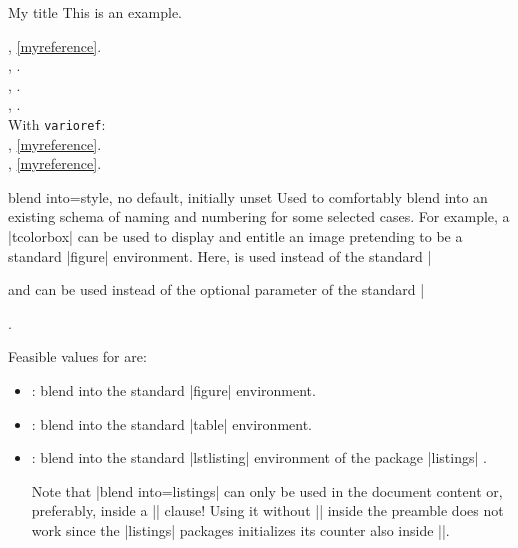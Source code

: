 \begin{dispExample}
\begin{mybluebox}[label={myreference}]{My title}
This is an example.
\end{mybluebox}

, \cref{myreference}.\\
, .\\
, .\\
, .\\
With \texttt{varioref}:\\
, \vref{myreference}.\\
, \vref*{myreference}.
\end{dispExample}

\clearpage

\begin{newTcbKey}[][doc new=2014-09-19]{blend into}{=}{style, no default, initially unset}
Used to comfortably blend into an existing schema of naming and numbering for
some selected cases. For example, a |tcolorbox| can be used to display
and entitle an image pretending to be a standard |figure| environment.
Here,  is used instead of the standard |\caption|
and  can be used instead of the optional parameter
of the standard |\caption|.

Feasible values for  are:
\begin{itemize}
\item{}: blend into the standard |figure| environment.
\item{}: blend into the standard |table| environment.
\item{}: blend into the standard |lstlisting| environment
  of the package |listings| \cite{hoffmann:2018a}.
  \begin{marker}
  Note that |blend into=listings| can only be used in the document content
  or, preferably, inside a |\AtBeginDocument| clause! Using it without
  |\AtBeginDocument| inside the preamble does not work since the |listings|
  packages initializes its counter also inside |\AtBeginDocument|.
  \end{marker}
\end{itemize}
\end{newTcbKey}


